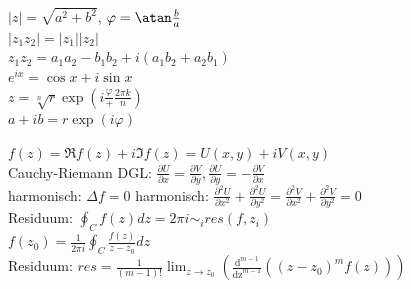 \documentclass[12pt,a4paper]{article}
\newcommand{\abs}[1]{\left| #1 \right|}
\newcommand{\pd}[2]{\frac{\partial #1}{\partial #2}}
\newcommand{\pdd}[2]{\frac{\partial^2 #1}{\partial #2^2}}
\renewcommand{\=}[1]{\stackrel{#1}{=}}
\theoremstyle{definition}
\theoremstyle{remark}
\begin{document}
\begin{center}
\begin{minipage}[t]{.39\linewidth}
\vspace{0pt}

$\abs{z} = \sqrt{a^2 + b^2}$, $\varphi = \atan \frac{b}{a}$\\
$\abs{z_1 z_2} = \abs{z_1} \abs{z_2}$\\
$z_1 z_2 = a_1 a_2 - b_1 b_2 + i(a_1 b_2 + a_2 b_1)$\\
$e^{ix} = \cos x + i \sin x$\\
$z = \sqrt[n]{r} \exp(i \frac{\varphi} + \frac{2\pi k}{n})$\\
$a + ib = r \exp(i \varphi)$\\
\end{minipage}%
\begin{minipage}[t]{.59\linewidth}
\vspace{0pt}

$f(z) = \Re f(z) + i \Im f(z) = U(x,y) + i V(x,y)$\\
Cauchy-Riemann DGL: $\pd{U}{x} = \pd{V}{y}, \pd{U}{y} = - \pd{V}{x}$\\
harmonisch: $\Delta f = 0$
harmonisch: $\pdd{U}{x} + \pdd{U}{y} = \pdd{V}{x} + \pdd{V}{y} = 0$\\
Residuum: $\oint_C f(z) dz = 2\pi i \sim_i res(f, z_i)$\\
$f(z_0) = \frac{1}{2\pi i} \oint_C \frac{f(z)}{z-z_0}dz$\\
Residuum: $res = \frac{1}{(m-1)!} \lim_{z \rightarrow z_0} (\frac{\text{d}^{m-1}}{\text{dz}^{m-1}}((z-z_0)^m f(z)))$\\

\end{minipage}
\end{center}
\end{document}
